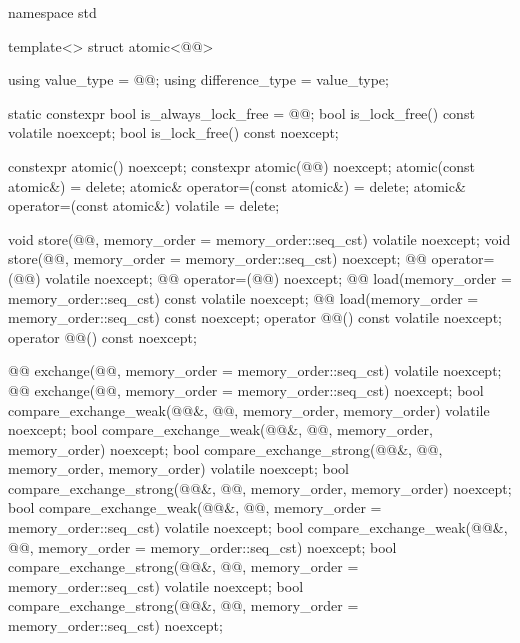 \begin{codeblock}
namespace std {
  template<> struct atomic<@@> {
    using value_type = @@;
    using difference_type = value_type;

    static constexpr bool is_always_lock_free = @@;
    bool is_lock_free() const volatile noexcept;
    bool is_lock_free() const noexcept;

    constexpr atomic() noexcept;
    constexpr atomic(@@) noexcept;
    atomic(const atomic&) = delete;
    atomic& operator=(const atomic&) = delete;
    atomic& operator=(const atomic&) volatile = delete;

    void store(@@, memory_order = memory_order::seq_cst) volatile noexcept;
    void store(@@, memory_order = memory_order::seq_cst) noexcept;
    @@ operator=(@@) volatile noexcept;
    @@ operator=(@@) noexcept;
    @@ load(memory_order = memory_order::seq_cst) const volatile noexcept;
    @@ load(memory_order = memory_order::seq_cst) const noexcept;
    operator @@() const volatile noexcept;
    operator @@() const noexcept;

    @@ exchange(@@, memory_order = memory_order::seq_cst) volatile noexcept;
    @@ exchange(@@, memory_order = memory_order::seq_cst) noexcept;
    bool compare_exchange_weak(@@&, @@,
                               memory_order, memory_order) volatile noexcept;
    bool compare_exchange_weak(@@&, @@,
                               memory_order, memory_order) noexcept;
    bool compare_exchange_strong(@@&, @@,
                                 memory_order, memory_order) volatile noexcept;
    bool compare_exchange_strong(@@&, @@,
                                 memory_order, memory_order) noexcept;
    bool compare_exchange_weak(@@&, @@,
                               memory_order = memory_order::seq_cst) volatile noexcept;
    bool compare_exchange_weak(@@&, @@,
                               memory_order = memory_order::seq_cst) noexcept;
    bool compare_exchange_strong(@@&, @@,
                                 memory_order = memory_order::seq_cst) volatile noexcept;
    bool compare_exchange_strong(@@&, @@,
                                 memory_order = memory_order::seq_cst) noexcept;

}}
\end{codeblock}

